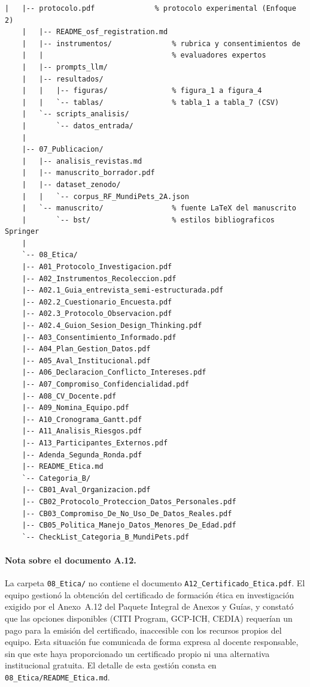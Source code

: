 \documentclass[journal,onecolumn]{IEEEtran}
\begin{document}
\begin{lstlisting}[style=csharp,caption={Estructura de carpetas del repositorio MundiPets-PFC-IngReq (árbol real al corte de la Entrega 3, 2A).},label={lst:estructura_repo}]
	|   |-- protocolo.pdf              % protocolo experimental (Enfoque 2)
	|   |-- README_osf_registration.md
	|   |-- instrumentos/              % rubrica y consentimientos de
	|   |                              % evaluadores expertos
	|   |-- prompts_llm/
	|   |-- resultados/
	|   |   |-- figuras/               % figura_1 a figura_4
	|   |   `-- tablas/                % tabla_1 a tabla_7 (CSV)
	|   `-- scripts_analisis/
	|       `-- datos_entrada/
	|
	|-- 07_Publicacion/
	|   |-- analisis_revistas.md
	|   |-- manuscrito_borrador.pdf
	|   |-- dataset_zenodo/
	|   |   `-- corpus_RF_MundiPets_2A.json
	|   `-- manuscrito/                % fuente LaTeX del manuscrito
	|       `-- bst/                   % estilos bibliograficos Springer
	|
	`-- 08_Etica/
	|-- A01_Protocolo_Investigacion.pdf
	|-- A02_Instrumentos_Recoleccion.pdf
	|-- A02.1_Guia_entrevista_semi-estructurada.pdf
	|-- A02.2_Cuestionario_Encuesta.pdf
	|-- A02.3_Protocolo_Observacion.pdf
	|-- A02.4_Guion_Sesion_Design_Thinking.pdf
	|-- A03_Consentimiento_Informado.pdf
	|-- A04_Plan_Gestion_Datos.pdf
	|-- A05_Aval_Institucional.pdf
	|-- A06_Declaracion_Conflicto_Intereses.pdf
	|-- A07_Compromiso_Confidencialidad.pdf
	|-- A08_CV_Docente.pdf
	|-- A09_Nomina_Equipo.pdf
	|-- A10_Cronograma_Gantt.pdf
	|-- A11_Analisis_Riesgos.pdf
	|-- A13_Participantes_Externos.pdf
	|-- Adenda_Segunda_Ronda.pdf
	|-- README_Etica.md
	`-- Categoria_B/
	|-- CB01_Aval_Organizacion.pdf
	|-- CB02_Protocolo_Proteccion_Datos_Personales.pdf
	|-- CB03_Compromiso_De_No_Uso_De_Datos_Reales.pdf
	|-- CB05_Politica_Manejo_Datos_Menores_De_Edad.pdf
	`-- CheckList_Categoria_B_MundiPets.pdf
\end{lstlisting}

\paragraph{Nota sobre el documento A.12.}
La carpeta \texttt{08\_Etica/} no contiene el documento
\texttt{A12\_Certificado\_Etica.pdf}. El equipo gestionó la obtención del
certificado de formación ética en investigación exigido por el Anexo~A.12
del Paquete Integral de Anexos y Guías, y constató que las opciones
disponibles (CITI Program, GCP-ICH, CEDIA) requerían un pago para la
emisión del certificado, inaccesible con los recursos propios del equipo.
Esta situación fue comunicada de forma expresa al docente responsable, sin
que este haya proporcionado un certificado propio ni una alternativa
institucional gratuita. El detalle de esta gestión consta en
\texttt{08\_Etica/README\_Etica.md}.
\end{document}
